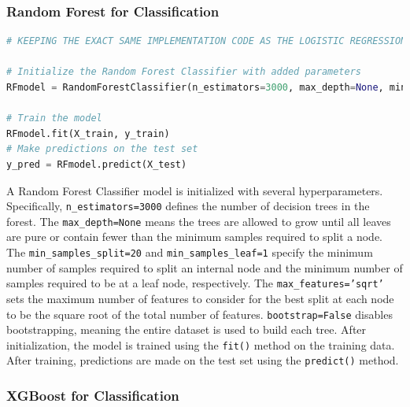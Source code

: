 
\subsubsection{Random Forest for Classification}
  
\begin{tcolorbox}[colback=gray!5!white, colframe=gray!80!black, boxrule=0.5pt, title=Random Forest Classifier Implementation]
    \begin{lstlisting}[language=Python]
# KEEPING THE EXACT SAME IMPLEMENTATION CODE AS THE LOGISTIC REGRESSION

# Initialize the Random Forest Classifier with added parameters
RFmodel = RandomForestClassifier(n_estimators=3000, max_depth=None, min_samples_split=20, min_samples_leaf=1, max_features='sqrt', bootstrap=False, random_state=42)

# Train the model
RFmodel.fit(X_train, y_train)
# Make predictions on the test set
y_pred = RFmodel.predict(X_test)
    \end{lstlisting}
\end{tcolorbox}

\noindent
 A Random Forest Classifier model is initialized with several hyperparameters. Specifically, \texttt{n\_estimators=3000} defines the number of decision trees in the forest. The \texttt{max\_depth=None} means the trees are allowed to grow until all leaves are pure or contain fewer than the minimum samples required to split a node. The \texttt{min\_samples\_split=20} and \texttt{min\_samples\_leaf=1} specify the minimum number of samples required to split an internal node and the minimum number of samples required to be at a leaf node, respectively. The \texttt{max\_features='sqrt'} sets the maximum number of features to consider for the best split at each node to be the square root of the total number of features. \texttt{bootstrap=False} disables bootstrapping, meaning the entire dataset is used to build each tree. After initialization, the model is trained using the \texttt{fit()} method on the training data. After training, predictions are made on the test set using the \texttt{predict()} method.



\subsubsection{XGBoost for Classification}

